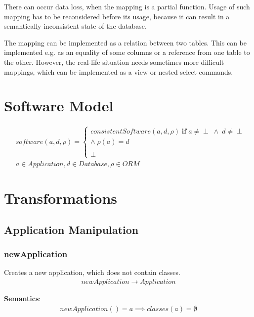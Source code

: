 \documentclass[10pt]{article}
\begin{document}
There can occur data loss, when the mapping is a partial function. Usage of such mapping has to be reconsidered before its usage, because it can result in a semantically inconsistent state of the database. 

The mapping can be implemented as a relation between two tables. This can be implemented e.g. as an equality of some columns or a reference from one table to the other. However, the real-life situation needs sometimes more difficult mappings, which can be implemented as a view or nested select commands. %



\section{Software Model}
\begin{align}
& software(a, d, \rho) = \begin{cases}
consistentSoftware(a, d, \rho) \; \textbf{if} \; a \neq \perp \; \wedge \; d \neq \perp \\ \wedge \; \rho(a) = d 
 \\\\
 \perp
 \end{cases}\\
& a \in Application, d \in Database, \rho \in ORM \nonumber
\end{align}



\section{Transformations}
\label{sec:transformations}
\subsection{Application Manipulation}
\subsubsection{newApplication}
Creates a new application, which does not contain classes.
\begin{align}
newApplication \rightarrow Application
\end{align}

\noindent \textbf{Semantics}:
\begin{align}
newApplication() = a \implies classes(a) = \emptyset
\end{align}
\end{document}

